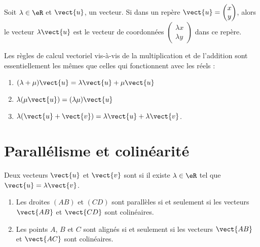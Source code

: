 \begin{definition}
    Soit \( \lambda\in \eR\) et \( \vect{ u }\), un vecteur. Si dans un repère \( \vect{ u }=\begin{pmatrix}
        x    \\ 
        y    
    \end{pmatrix}\), alors le vecteur \( \lambda\vect{ u }\) est le vecteur de coordonnées \( \begin{pmatrix}
        \lambda x    \\ 
        \lambda y    
    \end{pmatrix}\) dans ce repère.
\end{definition}

\begin{Aretenir}
    Les règles de calcul vectoriel vis-à-vis de la multiplication et de l'addition sont essentiellement les mêmes que celles qui fonctionnent avec les réels :
    \begin{enumerate}
        \item
            \( (\lambda+\mu)\vect{ u }=\lambda\vect{ u }+\mu\vect{ u }\)
        \item
            \( \lambda(\mu\vect{ u })=(\lambda\mu)\vect{ u }\)
        \item
            \( \lambda(\vect{ u }+\vect{ v })=\lambda\vect{ u }+\lambda\vect{ v }\).
    \end{enumerate}
\end{Aretenir}

\section{Parallélisme et colinéarité}

\begin{definition}
    Deux vecteurs \( \vect{ u }\) et \( \vect{ v }\) sont  si il existe \( \lambda\in \eR\) tel que \( \vect{ u }=\lambda\vect{ v }\).
\end{definition}

\begin{propriete}
    \begin{enumerate}
        \item
            Les droites \( (AB)\) et \( (CD)\) sont parallèles si et seulement si les vecteurs \( \vect{ AB }\) et \( \vect{ CD }\) sont colinéaires.
        \item
            Les points \( A\), \( B\) et \( C\) sont alignés si et seulement si les vecteurs \( \vect{ AB }\) et \( \vect{ AC }\) sont colinéaires.
    \end{enumerate}
\end{propriete}

